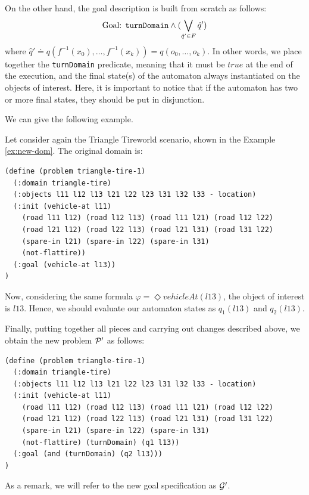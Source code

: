 On the other hand, the goal description is built from scratch as follows:
\begin{equation}
\text{Goal: } \text{\texttt{turnDomain}} \lAND (\bigvee_{\hat{q}' \in F} \hat{q}')
\end{equation}
where $\hat{q}' \doteq q(f^{-1}(x_0),\dots,f^{-1}(x_k)) = q(o_0,\dots,o_k)$. In other words, we place  together the \texttt{turnDomain} predicate, meaning that it must be $true$ at the end of the execution, and the final state(s) of the automaton always instantiated on the objects of interest. Here, it is important to notice that if the automaton has two or more final states, they should be put in disjunction.

We can give the following example.

\begin{example}\label{ex:new-prob}
Let consider again the Triangle Tireworld scenario, shown in the Example \ref{ex:new-dom}. The original \PDDL domain is:
\begin{lstlisting}[language=PDDL, escapechar=£]
(define (problem triangle-tire-1)
  (:domain triangle-tire)
  (:objects l11 l12 l13 l21 l22 l23 l31 l32 l33 - location)
  (:init (vehicle-at l11)
    (road l11 l12) (road l12 l13) (road l11 l21) (road l12 l22)
    (road l21 l12) (road l22 l13) (road l21 l31) (road l31 l22)
    (spare-in l21) (spare-in l22) (spare-in l31)
    (not-flattire))
  (:goal (vehicle-at l13))
)
\end{lstlisting}
Now, considering the same \LTLf formula $\varphi = \Diamond vehicleAt(l13)$, the object of interest is $l13$. Hence, we should evaluate our automaton states as $q_1(l13)$ and $q_2(l13)$.

Finally, putting together all pieces and carrying out changes described above, we obtain the new problem $\P'$ as follows:

\begin{lstlisting}[language=PDDL, escapechar=£]
(define (problem triangle-tire-1)
  (:domain triangle-tire)
  (:objects l11 l12 l13 l21 l22 l23 l31 l32 l33 - location)
  (:init (vehicle-at l11)
    (road l11 l12) (road l12 l13) (road l11 l21) (road l12 l22)
    (road l21 l12) (road l22 l13) (road l21 l31) (road l31 l22)
    (spare-in l21) (spare-in l22) (spare-in l31)
    (not-flattire) (turnDomain) (q1 l13))
  (:goal (and (turnDomain) (q2 l13)))
)
\end{lstlisting}
As a remark, we will refer to the new goal specification as $\G'$.
\end{example}


